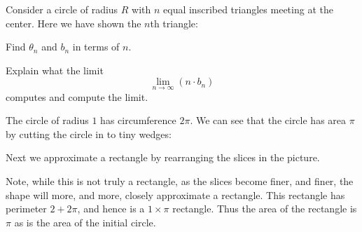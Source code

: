 \documentclass[newpage,hints,handout,noauthor,nooutcomes,12pt]{ximera}
\begin{document}
\begin{problem}
Consider a circle of radius $R$ with $n$ equal inscribed triangles
meeting at the center.  Here we have shown the $n$th triangle:
\begin{image}
\end{image}
Find $\theta_n$ and $b_n$ in terms of $n$.
\end{problem}


\begin{problem}
Explain what the limit
\[
\lim_{n\to\infty} \left(n\cdot b_n\right)
\]
computes and compute the limit.
\end{problem}



The circle of radius $1$ has circumference $2\pi$. We can see that the
circle has area $\pi$ by cutting the circle in to tiny wedges:
\begin{image}
\end{image}

Next we approximate a rectangle by rearranging the slices in the
picture. 
\begin{image}
\end{image}
Note, while this is not truly a rectangle, as the slices become finer,
and finer, the shape will more, and more, closely approximate a
rectangle. This rectangle has perimeter $2+2\pi$, and hence is a
$1\times \pi$ rectangle. Thus the area of the rectangle is $\pi$ as is
the area of the initial circle.
\end{document}

